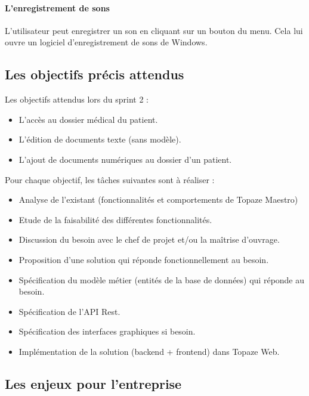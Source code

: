 \paragraph*{L'enregistrement de sons\\}
L'utilisateur peut enregistrer un son en cliquant sur un bouton du menu. Cela lui ouvre un logiciel d'enregistrement de sons de Windows.
 
\subsection{Les objectifs précis attendus}
Les objectifs attendus lors du sprint 2 : 
\begin{itemize}
\item L'accès au dossier médical du patient.
\item L'édition de documents texte (sans modèle).
\item L'ajout de documents numériques au dossier d'un patient.
\end{itemize}

Pour chaque objectif, les tâches suivantes sont à réaliser :
\begin{itemize}
\item Analyse de l'existant (fonctionnalités et comportements de Topaze Maestro) 
\item Etude de la faisabilité des différentes fonctionnalités.
\item Discussion du besoin avec le chef de projet et/ou la maîtrise d'ouvrage.
\item Proposition d'une solution qui réponde fonctionnellement au besoin.
\item Spécification  du modèle métier (entités de la base de données) qui réponde au besoin.
\item Spécification de l'API Rest.
\item Spécification des interfaces graphiques si besoin.
\item Implémentation de la solution (backend + frontend) dans Topaze Web.
\end{itemize}

\subsection{Les enjeux pour l'entreprise}
